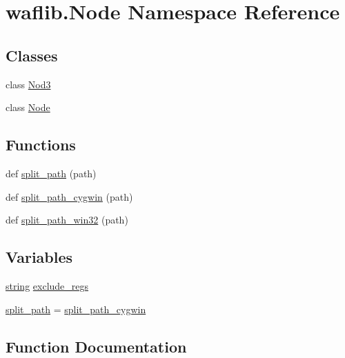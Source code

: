 \hypertarget{namespacewaflib_1_1_node}{}\section{waflib.\+Node Namespace Reference}
\label{namespacewaflib_1_1_node}
\subsection*{Classes}
\begin{DoxyCompactItemize}
\item 
class \hyperlink{classwaflib_1_1_node_1_1_nod3}{Nod3}
\item 
class \hyperlink{classwaflib_1_1_node_1_1_node}{Node}
\end{DoxyCompactItemize}
\subsection*{Functions}
\begin{DoxyCompactItemize}
\item 
def \hyperlink{namespacewaflib_1_1_node_ae580a314d04691a283552a4712b56a84}{split\+\_\+path} (path)
\item 
def \hyperlink{namespacewaflib_1_1_node_a089fc378e3863231aab10b6892a9bc2b}{split\+\_\+path\+\_\+cygwin} (path)
\item 
def \hyperlink{namespacewaflib_1_1_node_a20acd7540bbb7886232accfe0a2a4219}{split\+\_\+path\+\_\+win32} (path)
\end{DoxyCompactItemize}
\subsection*{Variables}
\begin{DoxyCompactItemize}
\item 
\hyperlink{test__lib_f_l_a_c_2format_8c_ab02026ad0de9fb6c1b4233deb0a00c75}{string} \hyperlink{namespacewaflib_1_1_node_ad8641c31ccc808156a4dd30338d3373c}{exclude\+\_\+regs}
\item 
\hyperlink{namespacewaflib_1_1_node_abaf115841ece756327532e2ea2b2a705}{split\+\_\+path} = \hyperlink{namespacewaflib_1_1_node_a089fc378e3863231aab10b6892a9bc2b}{split\+\_\+path\+\_\+cygwin}
\end{DoxyCompactItemize}


\subsection{Function Documentation}
